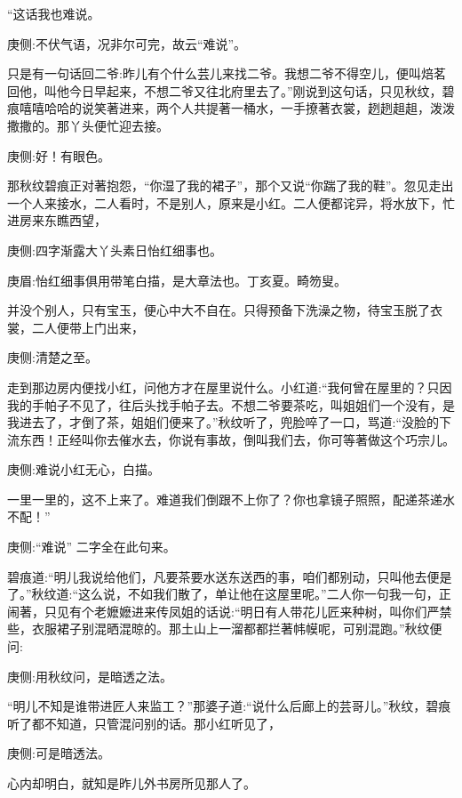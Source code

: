 \begin{parag}
    “这话我也难说。\begin{note}庚侧:不伏气语，况非尔可完，故云“难说”。\end{note}只是有一句话回二爷:昨儿有个什么芸儿来找二爷。我想二爷不得空儿，便叫焙茗回他，叫他今日早起来，不想二爷又往北府里去了。”刚说到这句话，只见秋纹，碧痕嘻嘻哈哈的说笑著进来，两个人共提著一桶水，一手撩著衣裳，趔趔趄趄，泼泼撒撒的。那丫头便忙迎去接。\begin{note}庚侧:好！有眼色。\end{note}那秋纹碧痕正对著抱怨，“你湿了我的裙子”，那个又说“你踹了我的鞋”。忽见走出一个人来接水，二人看时，不是别人，原来是小红。二人便都诧异，将水放下，忙进房来东瞧西望，\begin{note}庚侧:四字渐露大丫头素日怡红细事也。\end{note}\begin{note}庚眉:怡红细事俱用带笔白描，是大章法也。丁亥夏。畸笏叟。\end{note}并没个别人，只有宝玉，便心中大不自在。只得预备下洗澡之物，待宝玉脱了衣裳，二人便带上门出来，\begin{note}庚侧:清楚之至。\end{note}
\end{parag}


\begin{parag}
    走到那边房内便找小红，问他方才在屋里说什么。小红道:“我何曾在屋里的？只因我的手帕子不见了，往后头找手帕子去。不想二爷要茶吃，叫姐姐们一个没有，是我进去了，才倒了茶，姐姐们便来了。”秋纹听了，兜脸啐了一口，骂道:“没脸的下流东西！正经叫你去催水去，你说有事故，倒叫我们去，你可等著做这个巧宗儿。\begin{note}庚侧:难说小红无心，白描。\end{note}一里一里的，这不上来了。难道我们倒跟不上你了？你也拿镜子照照，配递茶递水不配！”\begin{note}庚侧:“难说” 二字全在此句来。\end{note}碧痕道:“明儿我说给他们，凡要茶要水送东送西的事，咱们都别动，只叫他去便是了。”秋纹道:“这么说，不如我们散了，单让他在这屋里呢。”二人你一句我一句，正闹著，只见有个老嬷嬷进来传凤姐的话说:“明日有人带花儿匠来种树，叫你们严禁些，衣服裙子别混晒混晾的。那土山上一溜都都拦著帏幙呢，可别混跑。”秋纹便问:\begin{note}庚侧:用秋纹问，是暗透之法。\end{note}“明儿不知是谁带进匠人来监工？”那婆子道:“说什么后廊上的芸哥儿。”秋纹，碧痕听了都不知道，只管混问别的话。那小红听见了，\begin{note}庚侧:可是暗透法。\end{note}心内却明白，就知是昨儿外书房所见那人了。
\end{parag}


